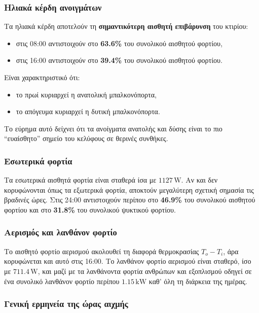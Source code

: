\documentclass[12pt,a4paper]{article}
\begin{document}
\subsubsection{Ηλιακά κέρδη ανοιγμάτων}

Τα ηλιακά κέρδη αποτελούν τη \textbf{σημαντικότερη αισθητή επιβάρυνση} του κτιρίου:

\begin{itemize}
\item στις 08:00 αντιστοιχούν στο \textbf{63.6\%} του συνολικού αισθητού φορτίου,
\item στις 16:00 αντιστοιχούν στο \textbf{39.4\%} του συνολικού αισθητού φορτίου.
\end{itemize}

Είναι χαρακτηριστικό ότι:

\begin{itemize}
\item το πρωί κυριαρχεί η ανατολική μπαλκονόπορτα,
\item το απόγευμα κυριαρχεί η δυτική μπαλκονόπορτα.
\end{itemize}

Το εύρημα αυτό δείχνει ότι τα ανοίγματα ανατολής και δύσης είναι το πιο ``ευαίσθητο''
σημείο του κελύφους σε θερινές συνθήκες.

\subsubsection{Εσωτερικά φορτία}

Τα εσωτερικά αισθητά φορτία είναι σταθερά ίσα με \(1127\,\mathrm{W}\). Αν και δεν
κορυφώνονται όπως τα εξωτερικά φορτία, αποκτούν μεγαλύτερη σχετική σημασία τις
βραδινές ώρες. Στις 24:00 αντιστοιχούν περίπου στο \textbf{46.9\%} του συνολικού
αισθητού φορτίου και στο \textbf{31.8\%} του συνολικού ψυκτικού φορτίου.

\subsubsection{Αερισμός και λανθάνον φορτίο}

Το αισθητό φορτίο αερισμού ακολουθεί τη διαφορά θερμοκρασίας \(T_o - T_i\), άρα
κορυφώνεται και αυτό στις 16:00. Το λανθάνον φορτίο αερισμού είναι σταθερό,
ίσο με \(711.4\,\mathrm{W}\), και μαζί με τα λανθάνοντα φορτία
ανθρώπων και εξοπλισμού οδηγεί σε ένα συνολικό λανθάνον φορτίο περίπου
\(1.15\,\mathrm{kW}\) καθ' όλη τη διάρκεια της ημέρας.

\subsubsection{Γενική ερμηνεία της ώρας αιχμής}
\end{document}
